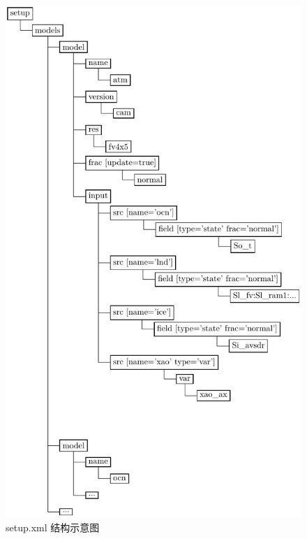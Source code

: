 \begin{figure}[H]
\begin{minipage}[t]{0.5\linewidth}
\centering
\includegraphics[height=.5\textheight]{../figures/setup.pdf}
\caption{setup.xml 结构示意图}
\end{minipage}
\begin{minipage}[t]{0.5\linewidth}
\centering

\end{minipage}
\end{figure}

